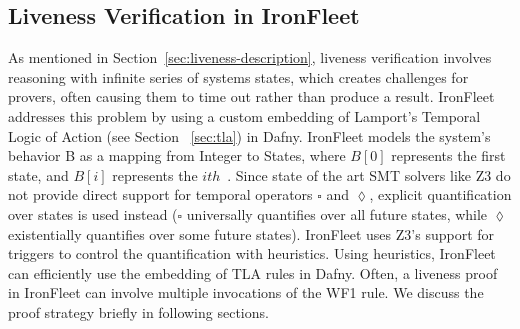 \documentclass{llncs}
\begin{document}
\subsection{Liveness Verification in IronFleet}\label{sec:liveness-ironfleet}
As mentioned in Section~\ref{sec:liveness-description}, liveness verification involves
reasoning with infinite series of systems states, which creates challenges for 
provers, often causing them to time out rather than produce a result. IronFleet addresses
this problem by using a custom embedding of Lamport's Temporal Logic of Action (see Section 
~\ref{sec:tla}) in Dafny. IronFleet models the system's behavior B as a mapping from Integer to
States, where $B[0]$ represents the first state, and $B[i]$ represents the $ith$~\cite{ironfleet}. 
Since state of the art SMT solvers like Z3 do not provide direct support for temporal operators
$\square$ and $\lozenge$, explicit quantification over states is used instead ($\square$ universally
quantifies over all future states, while $\lozenge$ existentially quantifies over some future states).
IronFleet uses Z3's support for triggers to control the quantification with heuristics. 
Using heuristics, IronFleet can efficiently use the embedding of TLA rules in Dafny. Often, a liveness proof in 
IronFleet can involve multiple invocations of the WF1 rule. We discuss the proof strategy briefly
in following sections.
\end{document}
